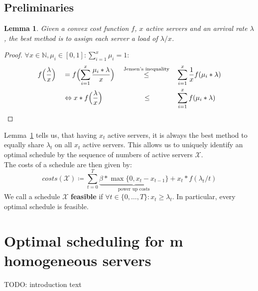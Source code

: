 \documentclass[hidelinks]{article}
\theoremstyle{plain}
\newtheorem{lem}[thm]{Lemma}
\theoremstyle{definition}
\theoremstyle{rem}
\newcommand{\mx}{\mathcal{X}}
\begin{document}
\begin{sloppypar}
\subsection{Preliminaries}
\begin{lem}\label{lem:share}
	Given a convex cost function $f$, $x$ active servers and an arrival rate $\lambda$, the best method is to assign each server a load of $\lambda/x$.
\end{lem}
\begin{proof}
$\forall x\in\mathbb{N},\mu_i\in[0,1]:\sum\limits_{i=1}^{x}{\mu_i}=1:$
\begin{alignat*}{4}
	&f\Bigl(\frac{\lambda}{x}\Bigr)&&=f\Bigl(\sum\limits_{i=1}^x{\frac{\mu_i*\lambda}{x}}\Bigr)&&\stackrel{\text{Jensen's inequality}}{\le}&&\sum\limits_{i=1}^x\frac{1}{x}f(\mu_i*\lambda) \\
	&&&\Leftrightarrow x*f\Bigl(\frac{\lambda}{x}\Bigr)&&\qquad\quad\le&&\sum\limits_{i=1}^xf(\mu_i*\lambda)
\end{alignat*}
\end{proof}
Lemma~\ref{lem:share} tells us, that having $x_t$ active servers, it is always the best method to equally share $\lambda_t$ on all $x_t$ active servers. This allows us to uniquely identify an optimal schedule by the sequence of numbers of active servers $\mx$.\\ The costs of a schedule are then given by:
\begin{equation*}
	costs(\mx)\coloneqq\sum\limits_{t=0}^{T}{\underbrace{\beta*\max\{0,x_{t}-x_{t-1}\}}_{\text{power up costs}}+x_t*f(\lambda_t/t)}
\end{equation*}
We call a schedule $\mx$ \textbf{feasible} if $\forall t\in\{0,\ldots,T\}: x_t\ge\lambda_t$. In particular, every optimal schedule is feasible.

\section{Optimal scheduling for m homogeneous servers}\label{sec:opt}
TODO: introduction text


\end{sloppypar}
\end{document}
